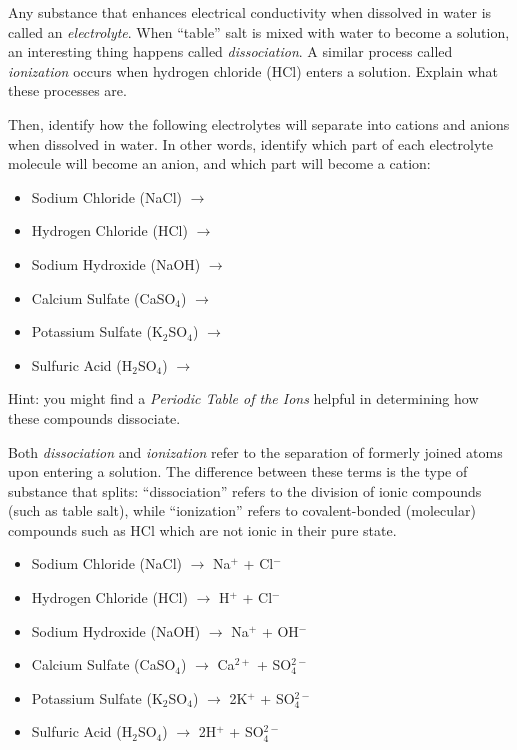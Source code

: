 

Any substance that enhances electrical conductivity when dissolved in water is called an {\it electrolyte}.  When ``table'' salt is mixed with water to become a solution, an interesting thing happens called {\it dissociation}.  A similar process called {\it ionization} occurs when hydrogen chloride (HCl) enters a solution.  Explain what these processes are.

Then, identify how the following electrolytes will separate into cations and anions when dissolved in water.  In other words, identify which part of each electrolyte molecule will become an anion, and which part will become a cation:

\begin{itemize}
\item{} Sodium Chloride (NaCl) $\to$
\vskip 5pt
\item{} Hydrogen Chloride (HCl) $\to$
\vskip 5pt
\item{} Sodium Hydroxide (NaOH) $\to$
\vskip 5pt
\item{} Calcium Sulfate (CaSO$_{4}$) $\to$
\vskip 5pt
\item{} Potassium Sulfate (K$_{2}$SO$_{4}$) $\to$
\vskip 5pt
\item{} Sulfuric Acid (H$_{2}$SO$_{4}$) $\to$
\end{itemize}

\vskip 10pt

Hint: you might find a {\it Periodic Table of the Ions} helpful in determining how these compounds dissociate.







Both {\it dissociation} and {\it ionization} refer to the separation of formerly joined atoms upon entering a solution.  The difference between these terms is the type of substance that splits: ``dissociation'' refers to the division of ionic compounds (such as table salt), while ``ionization'' refers to covalent-bonded (molecular) compounds such as HCl which are not ionic in their pure state.

\begin{itemize}
\item{} Sodium Chloride (NaCl) $\to$ Na$^{+}$ + Cl$^{-}$
\vskip 5pt
\item{} Hydrogen Chloride (HCl) $\to$ H$^{+}$ + Cl$^{-}$
\vskip 5pt
\item{} Sodium Hydroxide (NaOH) $\to$ Na$^{+}$ + OH$^{-}$
\vskip 5pt
\item{} Calcium Sulfate (CaSO$_{4}$) $\to$ Ca$^{2+}$ + SO$_{4}^{2-}$
\vskip 5pt
\item{} Potassium Sulfate (K$_{2}$SO$_{4}$) $\to$ 2K$^{+}$ + SO$_{4}^{2-}$
\vskip 5pt
\item{} Sulfuric Acid (H$_{2}$SO$_{4}$) $\to$ 2H$^{+}$ + SO$_{4}^{2-}$
\end{itemize}

